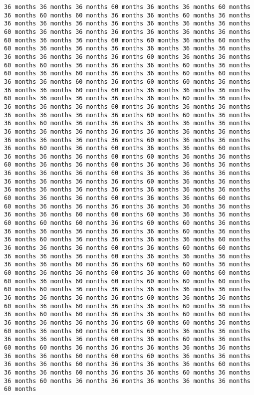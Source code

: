 \documentclass[11pt]{article}
\begin{document}
\begin{Verbatim}[commandchars=\\\{\}, frame=single, framerule=2mm, rulecolor=\color{outerrorbackground}]
36 months 36 months 36 months 60 months 36 months 36 months 60 months 36 months 60 months 60 months 36 months 36 months 60 months 36 months 36 months 36 months 36 months 36 months 36 months 36 months 36 months 60 months 36 months 36 months 36 months 36 months 36 months 36 months 60 months 36 months 36 months 60 months 60 months 36 months 60 months 60 months 36 months 36 months 36 months 36 months 36 months 36 months 36 months 36 months 36 months 36 months 60 months 36 months 36 months 60 months 60 months 36 months 36 months 36 months 60 months 36 months 60 months 36 months 60 months 36 months 36 months 60 months 60 months 36 months 36 months 60 months 36 months 60 months 60 months 36 months 36 months 36 months 60 months 60 months 36 months 36 months 36 months 60 months 36 months 36 months 36 months 36 months 60 months 36 months 36 months 36 months 36 months 60 months 36 months 36 months 36 months 36 months 36 months 36 months 36 months 60 months 60 months 36 months 36 months 60 months 36 months 36 months 36 months 36 months 36 months 36 months 36 months 36 months 36 months 36 months 36 months 36 months 36 months 36 months 36 months 36 months 60 months 36 months 36 months 36 months 60 months 36 months 60 months 36 months 36 months 60 months 36 months 36 months 36 months 60 months 60 months 36 months 36 months 60 months 36 months 36 months 60 months 36 months 36 months 36 months 36 months 36 months 36 months 60 months 36 months 36 months 36 months 36 months 36 months 36 months 36 months 60 months 36 months 36 months 36 months 36 months 36 months 36 months 36 months 36 months 36 months 60 months 36 months 36 months 60 months 36 months 36 months 60 months 60 months 36 months 36 months 36 months 36 months 36 months 36 months 36 months 36 months 60 months 60 months 60 months 36 months 36 months 60 months 60 months 60 months 36 months 60 months 60 months 36 months 36 months 36 months 36 months 36 months 36 months 60 months 36 months 36 months 60 months 36 months 36 months 36 months 36 months 60 months 36 months 36 months 36 months 60 months 36 months 60 months 60 months 36 months 36 months 36 months 60 months 36 months 36 months 36 months 36 months 36 months 60 months 36 months 60 months 60 months 36 months 60 months 36 months 36 months 60 months 36 months 60 months 60 months 60 months 36 months 60 months 60 months 60 months 60 months 60 months 60 months 60 months 36 months 36 months 36 months 36 months 36 months 36 months 36 months 36 months 36 months 60 months 36 months 36 months 60 months 36 months 60 months 36 months 36 months 60 months 36 months 36 months 60 months 60 months 36 months 36 months 60 months 60 months 36 months 36 months 36 months 36 months 60 months 60 months 36 months 60 months 36 months 60 months 60 months 60 months 36 months 36 months 36 months 36 months 36 months 60 months 36 months 60 months 36 months 60 months 60 months 36 months 36 months 36 months 36 months 36 months 36 months 36 months 60 months 60 months 60 months 36 months 36 months 36 months 36 months 60 months 36 months 36 months 36 months 60 months 36 months 36 months 60 months 36 months 36 months 60 months 36 months 36 months 60 months 36 months 36 months 36 months 36 months 36 months 60 months 
\end{Verbatim}
\end{document}
